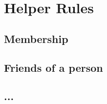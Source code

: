 %
%

\section{Helper Rules}
\label{helpers}

\subsection{Membership}
\label{appendix:member_of}

\subsection{Friends of a person}
\label{appendix:friends_of}

\subsection{...}
\label{appendix:friendCheck}
